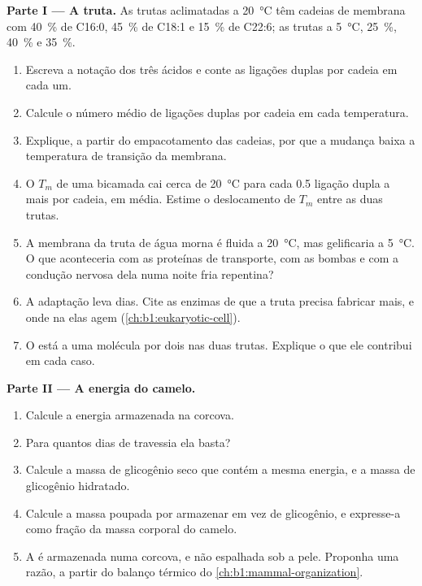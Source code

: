 \begin{problem}
\medskip
\noindent\textbf{Parte I --- A truta.}
As trutas aclimatadas a \qty{20}{\celsius} têm cadeias de membrana com
\qty{40}{\%} de C16:0, \qty{45}{\%} de C18:1 e \qty{15}{\%} de C22:6; as
trutas a \qty{5}{\celsius}, \qty{25}{\%}, \qty{40}{\%} e \qty{35}{\%}.
\begin{enumerate}
  \item Escreva a notação dos três ácidos e conte as ligações duplas por
        cadeia em cada um.
  \item Calcule o número médio de ligações duplas por cadeia em cada
        temperatura.
  \item Explique, a partir do empacotamento das cadeias, por que a
        mudança baixa a temperatura de transição da membrana.
  \item O $T_m$ de uma bicamada cai cerca de \qty{20}{\celsius} para
        cada \qty{0.5}{} ligação dupla a mais por cadeia, em média.
        Estime o deslocamento de $T_m$ entre as duas trutas.
  \item A membrana da truta de água morna é fluida a \qty{20}{\celsius},
        mas gelificaria a \qty{5}{\celsius}. O que aconteceria com as
        proteínas de transporte, com as bombas e com a condução nervosa
        dela numa noite fria repentina?
  \item A adaptação leva dias. Cite as enzimas de que a truta precisa
        fabricar mais, e onde na  elas agem (\cref{ch:b1:eukaryotic-cell}).
  \item O  está a uma molécula por dois  nas duas
        trutas. Explique o que ele contribui em cada caso.
\end{enumerate}

\medskip
\noindent\textbf{Parte II --- A energia do camelo.}
\begin{enumerate}[resume]
  \item Calcule a energia armazenada na corcova.
  \item Para quantos dias de travessia ela basta?
  \item Calcule a massa de glicogênio seco que contém a mesma energia, e
        a massa de glicogênio hidratado.
  \item Calcule a massa poupada por armazenar  em vez de
        glicogênio, e expresse-a como fração da massa corporal do
        camelo.
  \item A  é armazenada numa corcova, e não espalhada sob a pele.
        Proponha uma razão, a partir do balanço térmico do
        \cref{ch:b1:mammal-organization}.
\end{enumerate}


\end{problem}

